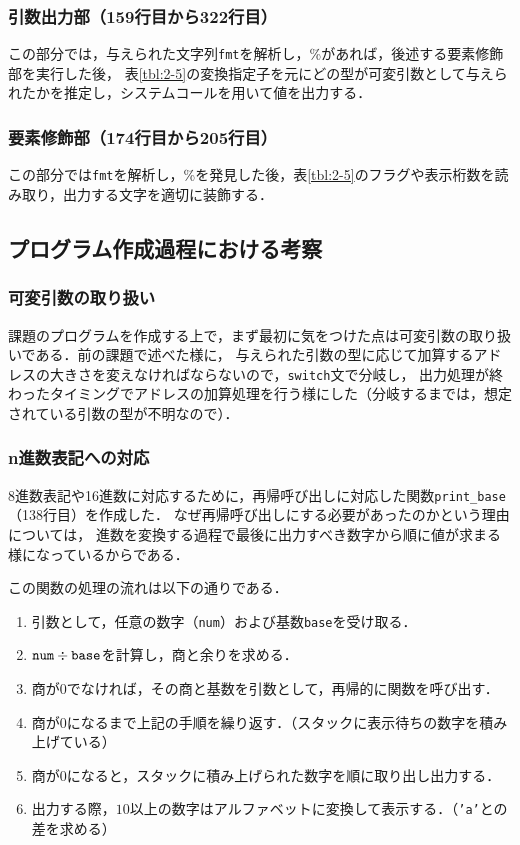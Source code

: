 \documentclass[a4j,11pt]{jarticle}
\begin{document}
\subsubsection{引数出力部（159行目から322行目）}

この部分では，与えられた文字列{{\tt fmt}}を解析し，\%があれば，後述する要素修飾部を実行した後，
表\ref{tbl:2-5}の変換指定子を元にどの型が可変引数として与えられたかを推定し，システムコールを用いて値を出力する．

\subsubsection{要素修飾部（174行目から205行目）}

この部分では{{\tt fmt}}を解析し，\%を発見した後，表\ref{tbl:2-5}のフラグや表示桁数を読み取り，出力する文字を適切に装飾する．

\subsection{プログラム作成過程における考察}

\subsubsection{可変引数の取り扱い}
課題のプログラムを作成する上で，まず最初に気をつけた点は可変引数の取り扱いである．前の課題で述べた様に，
与えられた引数の型に応じて加算するアドレスの大きさを変えなければならないので，{{\tt switch}}文で分岐し，
出力処理が終わったタイミングでアドレスの加算処理を行う様にした（分岐するまでは，想定されている引数の型が不明なので）．

\subsubsection{n進数表記への対応}
8進数表記や16進数に対応するために，再帰呼び出しに対応した関数{{\tt print\_base}}（138行目）を作成した．
なぜ再帰呼び出しにする必要があったのかという理由については，
進数を変換する過程で最後に出力すべき数字から順に値が求まる様になっているからである．

この関数の処理の流れは以下の通りである．
\begin{enumerate}
      \item 引数として，任意の数字（{\tt num}）および基数{\tt base}を受け取る．
      \item ${\tt num}\div{\tt base}$を計算し，商と余りを求める．
      \item 商が$0$でなければ，その商と基数を引数として，再帰的に関数を呼び出す．
      \item 商が$0$になるまで上記の手順を繰り返す．（スタックに表示待ちの数字を積み上げている）
      \item 商が$0$になると，スタックに積み上げられた数字を順に取り出し出力する．
      \item 出力する際，$10$以上の数字はアルファベットに変換して表示する．（{{\tt 'a'}}との差を求める）
\end{enumerate}
\end{document}
